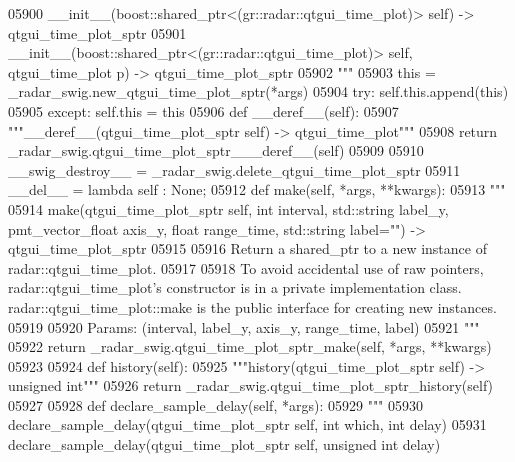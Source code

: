 \begin{DoxyCode}
{{{{{{{{{{{{{{{{{{{{05900 \textcolor{stringliteral}{        \_\_init\_\_(boost::shared\_ptr<(gr::radar::qtgui\_time\_plot)> self) -> qtgui\_time\_plot\_sptr}
05901 \textcolor{stringliteral}{        \_\_init\_\_(boost::shared\_ptr<(gr::radar::qtgui\_time\_plot)> self, qtgui\_time\_plot p) ->
       qtgui\_time\_plot\_sptr}
05902 \textcolor{stringliteral}{        """}
05903         this = \_radar\_swig.new\_qtgui\_time\_plot\_sptr(*args)
05904         \textcolor{keywordflow}{try}: self.this.append(this)
05905         \textcolor{keywordflow}{except}: self.this = this
05906     \textcolor{keyword}{def }__deref__(self):
05907         \textcolor{stringliteral}{"""\_\_deref\_\_(qtgui\_time\_plot\_sptr self) -> qtgui\_time\_plot"""}
05908         \textcolor{keywordflow}{return} \_radar\_swig.qtgui\_time\_plot\_sptr\_\_\_deref\_\_(self)
05909 
05910     \_\_swig\_destroy\_\_ = \_radar\_swig.delete\_qtgui\_time\_plot\_sptr
05911     \_\_del\_\_ = \textcolor{keyword}{lambda} self : \textcolor{keywordtype}{None};
05912     \textcolor{keyword}{def }make(self, *args, **kwargs):
05913         \textcolor{stringliteral}{"""}
05914 \textcolor{stringliteral}{        make(qtgui\_time\_plot\_sptr self, int interval, std::string label\_y, pmt\_vector\_float axis\_y, float
       range\_time, std::string label="") -> qtgui\_time\_plot\_sptr}
05915 \textcolor{stringliteral}{}
05916 \textcolor{stringliteral}{        Return a shared\_ptr to a new instance of radar::qtgui\_time\_plot.}
05917 \textcolor{stringliteral}{}
05918 \textcolor{stringliteral}{        To avoid accidental use of raw pointers, radar::qtgui\_time\_plot's constructor is in a private
       implementation class. radar::qtgui\_time\_plot::make is the public interface for creating new instances.}
05919 \textcolor{stringliteral}{}
05920 \textcolor{stringliteral}{        Params: (interval, label\_y, axis\_y, range\_time, label)}
05921 \textcolor{stringliteral}{        """}
05922         \textcolor{keywordflow}{return} \_radar\_swig.qtgui\_time\_plot\_sptr\_make(self, *args, **kwargs)
05923 
05924     \textcolor{keyword}{def }history(self):
05925         \textcolor{stringliteral}{"""history(qtgui\_time\_plot\_sptr self) -> unsigned int"""}
05926         \textcolor{keywordflow}{return} \_radar\_swig.qtgui\_time\_plot\_sptr\_history(self)
05927 
05928     \textcolor{keyword}{def }declare_sample_delay(self, *args):
05929         \textcolor{stringliteral}{"""}
05930 \textcolor{stringliteral}{        declare\_sample\_delay(qtgui\_time\_plot\_sptr self, int which, int delay)}
05931 \textcolor{stringliteral}{        declare\_sample\_delay(qtgui\_time\_plot\_sptr self, unsigned int delay)}
}}}}}}}}}}}}}}}}}}}}
\end{DoxyCode}

